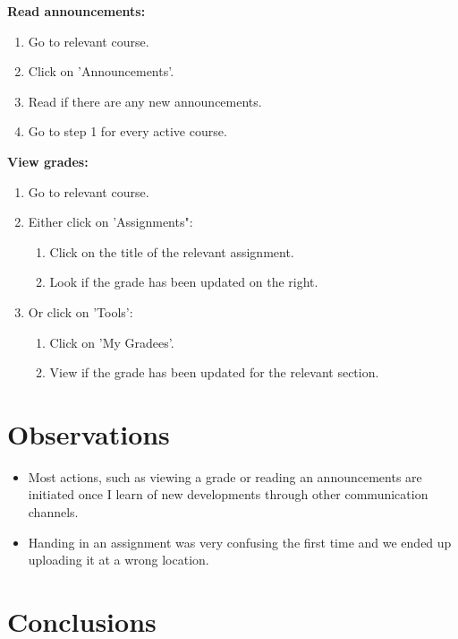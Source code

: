 \pagebreak[4]

\textbf{Read announcements:}
\begin{enumerate}
	\item Go to relevant course.
	\item Click on 'Announcements'.
	\item Read if there are any new announcements.
	\item Go to step 1 for every active course.
\end{enumerate}

\textbf{View grades:}
\begin{enumerate}
	\item Go to relevant course.
	\item Either click on 'Assignments":
	\begin{enumerate}
		\item Click on the title of the relevant assignment.
		\item Look if the grade has been updated on the right.
	\end{enumerate}
	\item Or click on 'Tools':
	\begin{enumerate}
		\item Click on 'My Gradees'.
		\item View if the grade has been updated for the relevant section.
	\end{enumerate}
\end{enumerate}


\section{Observations}

\begin{itemize}
	\item Most actions, such as viewing a grade or reading an announcements are initiated once I learn of new developments through other communication channels.
	\item Handing in an assignment was very confusing the first time and we ended up uploading it at a wrong location.
\end{itemize}


\section{Conclusions}

